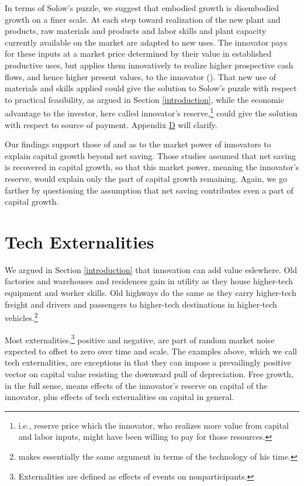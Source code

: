 \documentclass[a4padisinvitingper,fleqn]{latex_styles/cas-sc}
\begin{document}
In terms of Solow's puzzle, we suggest that embodied growth is disembodied growth
on a finer scale. At each step toward realization of the new plant and
products, raw materials and products and labor skills and plant capacity
currently available on the market are adapted to new uses. The innovator
pays for these inputs at a market price determined by their value in
established productive uses, but applies them innovatively to realize
higher prospective cash flows, and hence higher present values, to the
innovator
(\citet{marshallPrinciplesEconomics1890, schumpeterTheoryEconomicDevelopment1934}).
That new use of materials and skills applied could give the solution to Solow's puzzle with respect to practical feasibility, as argued in Section \ref{introduction}, while the economic advantage to the investor, here called innovator's reserve,\footnote{i.e., reserve price which the innovator, who realizes more value from capital and labor inputs, might have been willing to pay for those resources.} could give the solution with respect to source of payment. Appendix \hyperref[appendix-d]{D} will clarify.

Our findings support those of \cite{picketyCapitalIsBack2014} and \cite{kurz2023market} as to the market power of innovators to explain capital growth beyond net saving. Those studies assumed that net saving is recovered in capital growth, so that this market power, meaning the innovator's reserve, would explain only the part of capital growth remaining. Again, we go farther by questioning the assumption that net saving contributes even a part of capital growth.

\hypertarget{tech-externalities}{%
\section{Tech Externalities}\label{tech-externalities}}

We argued in Section \ref{introduction} that innovation can add value eslewhere. Old factories and warehouses and residences gain in utility as they house higher-tech equipment and worker skills. Old highways do the same as they carry higher-tech freight and drivers and passengers to higher-tech destinations in higher-tech vehicles.\footnote{\cite{raeNewPrinciplesPolitical1834} makes essentially the same argument in terms of the technology of his time.}

Most externalities,\footnote{Externalities are defined as effects of events on nonparticipants.} positive and negative, are part of random market noise expected to offset to zero over time and scale. The examples above, which we call tech externalities, are exceptions in that they can impose a prevailingly positive vector on capital value resisting the downward pull of depreciation. Free growth, in the full sense, means effects of the innovator's reserve on capital of the innovator, plus effects of tech externalities on capital in general.
\end{document}
